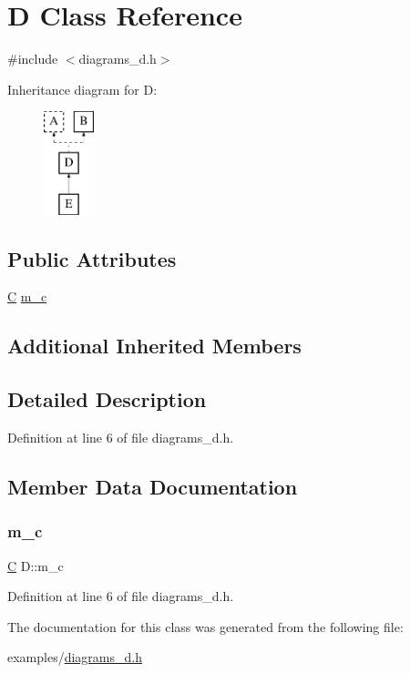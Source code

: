\hypertarget{class_d}{}\section{D Class Reference}
\label{class_d}


{\ttfamily \#include $<$diagrams\+\_\+d.\+h$>$}

Inheritance diagram for D\+:\begin{figure}[H]
\begin{center}
\leavevmode
\includegraphics[height=3.000000cm]{class_d}
\end{center}
\end{figure}
\subsection*{Public Attributes}
\begin{DoxyCompactItemize}
\item 
\mbox{\hyperlink{class_c}{C}} \mbox{\hyperlink{class_d_a9d877c7aa092f423f2a073f3c62fef9c}{m\+\_\+c}}
\end{DoxyCompactItemize}
\subsection*{Additional Inherited Members}


\subsection{Detailed Description}


Definition at line 6 of file diagrams\+\_\+d.\+h.



\subsection{Member Data Documentation}
\mbox{\label{class_d_a9d877c7aa092f423f2a073f3c62fef9c}} 
\subsubsection{\texorpdfstring{m\_c}{m\_c}}
{\footnotesize\ttfamily \mbox{\hyperlink{class_c}{C}} D\+::m\+\_\+c}



Definition at line 6 of file diagrams\+\_\+d.\+h.



The documentation for this class was generated from the following file\+:\begin{DoxyCompactItemize}
\item 
examples/\mbox{\hyperlink{diagrams__d_8h}{diagrams\+\_\+d.\+h}}\end{DoxyCompactItemize}
